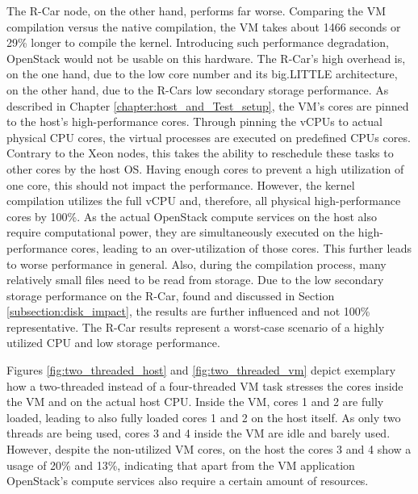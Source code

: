             \noindent The R-Car node, on the other hand, performs far worse.
            Comparing the \ac{VM} compilation versus the native compilation, the \ac{VM} takes about 1466 seconds or 29\% longer to compile the kernel.
            Introducing such performance degradation, OpenStack would not be usable on this hardware.
            The R-Car's high overhead is, on the one hand, due to the low core number and its big.LITTLE architecture, on the other hand, due to the R-Cars low secondary storage performance.
            As described in Chapter \ref{chapter:host_and_Test_setup}, the VM's cores are pinned to the host's high-performance cores.
            Through pinning the \acp{vCPU} to actual physical \ac{CPU} cores, the virtual processes are executed on predefined \acp{CPU} cores.
            Contrary to the Xeon nodes, this takes the ability to reschedule these tasks to other cores by the host \ac{OS}.
            Having enough cores to prevent a high utilization of one core, this should not impact the performance.
            However, the kernel compilation utilizes the full \ac{vCPU} and, therefore, all physical high-performance cores by 100\%.
            As the actual OpenStack compute services on the host also require computational power, they are simultaneously executed on the high-performance cores, leading to an over-utilization of those cores.
            This further leads to worse performance in general.
            Also, during the compilation process, many relatively small files need to be read from storage. 
            Due to the low secondary storage performance on the R-Car, found and discussed in Section \ref{subsection:disk_impact}, the results are further influenced and not 100\% representative.
            The R-Car results represent a worst-case scenario of a highly utilized CPU and low storage performance. 
                        
            \noindent Figures \ref{fig:two_threaded_host} and \ref{fig:two_threaded_vm} depict exemplary how a two-threaded instead of a four-threaded \ac{VM} task stresses the cores inside the \ac{VM} and on the actual host \ac{CPU}.
            Inside the VM, cores 1 and 2 are fully loaded, leading to also fully loaded cores 1 and 2 on the host itself.
            As only two threads are being used, cores 3 and 4 inside the VM are idle and barely used.
            However, despite the non-utilized VM cores, on the host the cores 3 and 4 show a usage of 20\% and 13\%, indicating that apart from the VM application OpenStack's compute services also require a certain amount of resources.
            
